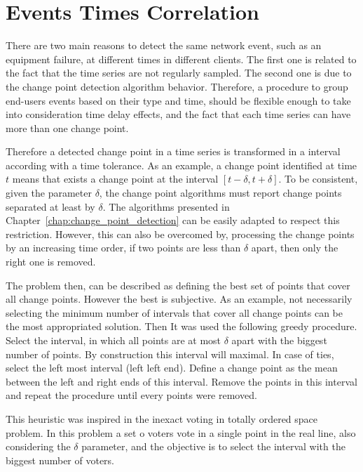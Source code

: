 \section{Events Times Correlation}
\label{sec:events_times_correlation}

There are two main reasons to detect the same network event, such as an
equipment failure, at different times in different clients. The first one is
related to the fact that the time series are not regularly sampled. The second
one is due to the change point detection algorithm behavior.
Therefore, a procedure to group end-users events based on their type and time,
should be flexible enough to take into consideration time delay effects, and
the fact that each time series can have more than one change point.

Therefore a detected change point in a time series is transformed in a interval
according with a time tolerance. As an example, a change point identified at
time $t$ means that exists a change point at the interval
$[t - \delta, t + \delta]$. To be consistent, given the parameter $\delta$, the
change point algorithms must report change points separated at least by
$\delta$. The algorithms presented in Chapter~\ref{chap:change_point_detection}
can be easily adapted to respect this restriction. However, this can also be
overcomed by, processing the change points by an increasing time order, if two
points are less than $\delta$ apart, then only the right one is removed.

The problem then, can be described as defining the best set of points that
cover all change points. However the best is subjective. As an example, not
necessarily selecting the minimum number of intervals that cover all change
points can be the most appropriated solution.
Then
It was used the following greedy procedure. Select the interval, in which all
points are at most $\delta$ apart with the biggest number of points.
By construction this interval will maximal.
In case of
ties, select the left most interval (left left end).
Define a change point as the mean between
the left and right ends of this interval. Remove the points in this interval
and repeat the procedure until every points were removed.

This heuristic was inspired in the inexact voting in totally
ordered space~\cite{voting_algorithms} problem. In this problem a set o voters
vote in a single point in the real line, also considering the $\delta$ parameter,
and the objective is to
select the interval with the biggest number of voters.

